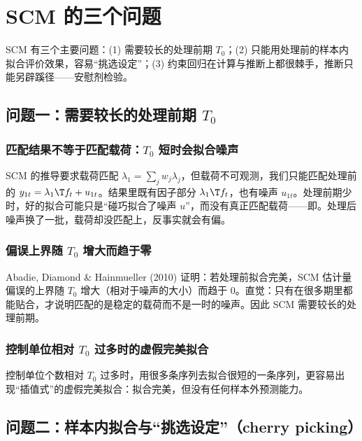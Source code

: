 \section{SCM 的三个问题}\label{sec:U16-scm-problems}

SCM 有三个主要问题：(1) 需要较长的处理前期 $T_0$；(2) 只能用处理前的样本内拟合评价效果，容易“挑选设定”；(3) 约束回归在计算与推断上都很棘手，推断只能另辟蹊径——安慰剂检验。

\subsection{问题一：需要较长的处理前期 \texorpdfstring{$T_0$}{T0}}

\subsubsection{匹配结果不等于匹配载荷：\texorpdfstring{$T_0$}{T0} 短时会拟合噪声}

SCM 的推导要求载荷匹配 $\lambda_1=\sum_jw_j\lambda_j$，但载荷不可观测，我们只能匹配处理前的 $y_{1t}=\lambda_1\T f_t+u_{1t}$。结果里既有因子部分 $\lambda_1\T f_t$，也有噪声 $u_{1t}$。处理前期少时，好的拟合可能只是“碰巧拟合了噪声 $u$”，而没有真正匹配载荷——即。处理后噪声换了一批，载荷却没匹配上，反事实就会有偏。

\subsubsection{偏误上界随 \texorpdfstring{$T_0$}{T0} 增大而趋于零}

Abadie, Diamond \& Hainmueller (2010) 证明：若处理前拟合完美，SCM 估计量偏误的上界随 $T_0$ 增大（相对于噪声的大小）而趋于 0。直觉：只有在很多期里都能贴合，才说明匹配的是稳定的载荷而不是一时的噪声。因此 SCM 需要较长的处理前期。

\subsubsection{控制单位相对 \texorpdfstring{$T_0$}{T0} 过多时的虚假完美拟合}

控制单位个数相对 $T_0$ 过多时，用很多条序列去拟合很短的一条序列，更容易出现“插值式”的虚假完美拟合：拟合完美，但没有任何样本外预测能力。

\subsection{问题二：样本内拟合与“挑选设定”（cherry picking）}

